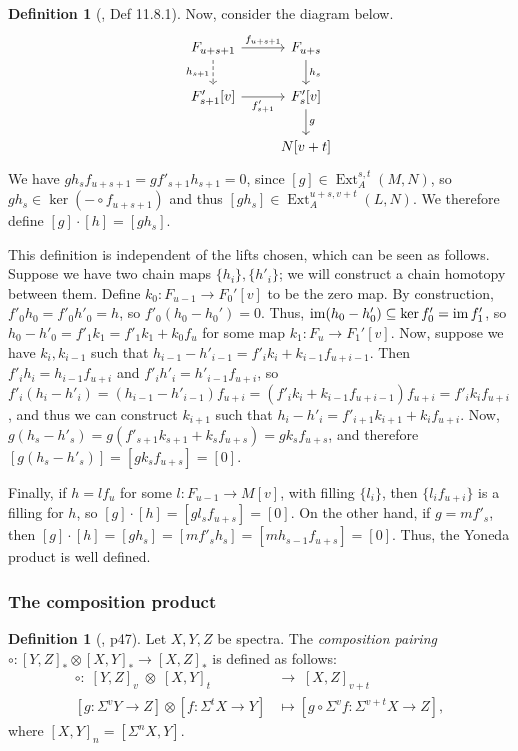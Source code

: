 \documentclass[11pt, titlepage]{article} %
\def\subq{\ensuremath\subseteq}
\DeclareMathOperator{\Ext}{Ext}
\DeclareMathOperator{\im}{im}
\numberwithin{equation}{subsection}
\theoremstyle{plain}
\theoremstyle{definition}
\newtheorem{definition}[theorem]{Definition}
\begin{document}
\begin{definition}[\autocite{rognes2}, Def 11.8.1]
Now, consider the diagram below.
\[\begin{tikzcd}
F_{u+s+1} \arrow[r, "f_{u+s+1}"] \arrow[d, swap, "h_{s+1}", dashrightarrow]  & F_{u+s} \arrow[d, "h_{s}"]  \\
F'_{s+1}[v] \arrow[r, swap, "f'_{s+1}"]  & F'_{s}[v] \arrow[d, "g"]\\
& N[v+t]
\end{tikzcd}\]
We have \(gh_sf_{u+s+1}=gf'_{s+1}h_{s+1}=0\), since \([g] \in \Ext_A^{s,t}(M, N)\), so \(gh_s\in \ker(-\circ f_{u+s+1})\) and thus \([gh_s]\in \Ext_A^{u+s, v+t}(L, N)\). We therefore define \([g]\cdot  [h]=[gh_s]\). 
\end{definition}

This definition is independent of the lifts chosen, which can be seen as follows. Suppose we have two chain maps \(\{h_i\}, \{h'_i\}\); we will construct a chain homotopy between them. Define \(k_0 : F_{u-1}\to F_0'[v]\) to be the zero map. By construction, \(f'_0h_0=f'_0h'_0=h\), so \(f'_0(h_0-h_0')=0\). Thus, \(\im(h_0-h'_0)\subq \ker f'_0=\im f'_1\), so \(h_0-h'_0=f'_1k_1=f'_1k_1+k_0f_{u}\) for some map \(k_1 : F_u \to F_1'[v]\). Now, suppose we have \(k_i, k_{i-1}\) such that \(h_{i-1}-h'_{i-1} = f'_{i}k_i+k_{i-1}f_{u+i-1}\). Then \(f'_ih_i=h_{i-1}f_{u+i}\) and \(f'_ih'_i=h'_{i-1}f_{u+i}\), so \(f'_i(h_i-h'_i)=(h_{i-1}-h'_{i-1})f_{u+i}=(f'_{i}k_i+k_{i-1}f_{u+i-1})f_{u+i}=f'_ik_if_{u+i}\), and thus we can construct \(k_{i+1}\) such that \(h_i-h'_i=f'_{i+1}k_{i+1}+k_if_{u+i}\). Now, \(g(h_s-h'_s)=g(f'_{s+1}k_{s+1}+k_sf_{u+s})=gk_sf_{u+s}\), and therefore \([g(h_s-h'_s)]=[gk_sf_{u+s}]=[0]\).

Finally, if \(h=lf_u\) for some \(l : F_{u-1}\to M[v]\), with filling \(\{l_i\}\), then \(\{l_if_{u+i}\}\) is a filling for \(h\), so \([g]\cdot [h]=[gl_sf_{u+s}]=[0]\). On the other hand, if \(g=mf'_{s}\), then \([g]\cdot[h]=[gh_s]=[mf'_sh_s]=[mh_{s-1}f_{u+s}]=[0]\). Thus, the Yoneda product is well defined.

\subsubsection{The composition product}

\begin{definition}[{\autocite{ass}, p47}]
Let \(X, Y, Z\) be spectra. The \textit{composition pairing} \(\circ : [Y, Z]_* \otimes [X,Y]_* \to [X,Z]_*\) is defined as follows: 
\begin{align*}
\circ :\; [Y, Z]_v\; \otimes \;[X,Y]_t\; &\to\; [X,Z]_{v+t}\\
[g : \Sigma^v Y \to Z]\otimes [f : \Sigma^t X\to Y] &\mapsto [g \circ \Sigma^v f : \Sigma^{v+t}X\to Z],
\end{align*}
where \([X,Y]_n=[\Sigma^n X, Y]\).
\end{definition}
\end{document}
